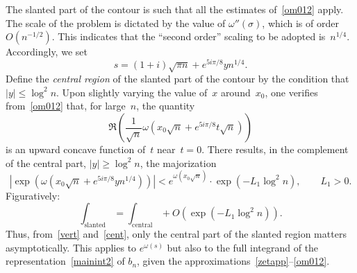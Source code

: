 \documentclass{amsart}
\begin{document}
The slanted part of
the contour is such that all the estimates of~\eqref{om012} apply. 
The scale of the problem is dictated by the value of $\omega''(\sigma)$,
 which is of order $O(n^{-1/2})$. This indicates that the ``second order'' scaling 
to be adopted is~$n^{1/4}$. Accordingly, we set
\begin{equation}\label{cregion}
s=(1+i)\sqrt{\pi n}+e^{5i\pi/8}yn^{1/4}.
\end{equation}
Define the \emph{central region} of the slanted part of the contour by the condition
that $|y|\le \log^2 n$.
Upon slightly varying the value of~$x$ around~$x_0$, one verifies from~\eqref{om012} that,
for large~$n$, the quantity
\[
\Re\left(\frac{1}{\sqrt{n}}
\omega\left(x_0\sqrt{n}+e^{5i\pi/8}t\sqrt{n}\right)\right)
\]
is an upward concave function of~$t$ near~$t=0$. There results,
in the complement of the central part, $|y|\ge \log^2n$,
the majorization
\[
\left|\exp\left(\omega\left(x_0\sqrt{n}+e^{5i\pi/8}yn^{1/4}\right)\right)\right|
< e^{\omega(x_0\sqrt{n})}
\cdot \exp\left(-L_1 \log^2 n\right),\qquad L_1>0.
\]
Figuratively:
\begin{equation}\label{cent}
\int_{\operatorname{slanted}}=\int_{\operatorname{central}}+O\left(\exp\left(-L_1 \log^2 n\right)\right).
\end{equation}
Thus, from~\eqref{vert}  and~\eqref{cent},  only the central   part of the
slanted region matters asymptotically. This applies to $e^{\omega(s)}$ but also
to the full integrand of the representation~\eqref{mainint2} of $b_n$,
given the approximations~\eqref{zetapp}--\eqref{om012}.

\smallskip
\end{document}
